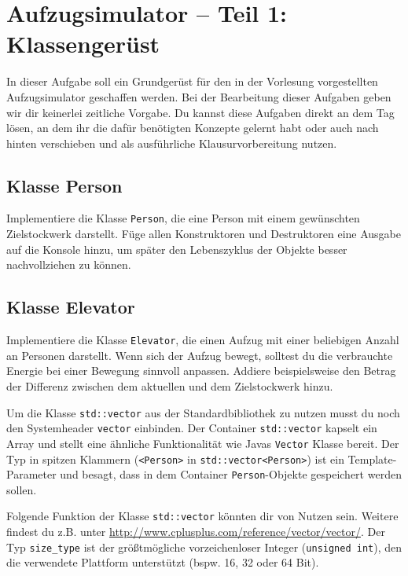 \section{\ExercisePrefixElevator Aufzugsimulator -- Teil 1: Klassengerüst \optional}

\optionaltextbox

%
In dieser Aufgabe soll ein Grundgerüst für den in der Vorlesung vorgestellten Aufzugsimulator geschaffen werden.
Bei der Bearbeitung dieser Aufgaben geben wir dir keinerlei zeitliche Vorgabe.
Du kannst diese Aufgaben direkt an dem Tag lösen, an dem ihr die dafür benötigten Konzepte gelernt habt oder auch nach hinten verschieben und als ausführliche Klausurvorbereitung nutzen.

\subsection{Klasse Person}
Implementiere die Klasse \lstinline{Person}, die eine Person mit einem gewünschten Zielstockwerk darstellt.
Füge allen Konstruktoren und Destruktoren eine Ausgabe auf die Konsole hinzu, um später den Lebenszyklus der Objekte besser nachvollziehen zu können.


\subsection{Klasse Elevator}
Implementiere die Klasse \lstinline{Elevator}, die einen Aufzug mit einer beliebigen Anzahl an Personen darstellt.
%
Wenn sich der Aufzug bewegt, solltest du die verbrauchte Energie bei einer Bewegung sinnvoll anpassen.
Addiere beispielsweise den Betrag der Differenz zwischen dem aktuellen und dem Zielstockwerk hinzu.


Um die Klasse \lstinline{std::vector} aus der Standardbibliothek zu nutzen musst du noch den Systemheader \lstinline{vector} einbinden.
Der Container \lstinline{std::vector} kapselt ein Array und stellt eine ähnliche Funktionalität wie Javas \lstinline{Vector} Klasse bereit.
Der Typ in spitzen Klammern (\lstinline{<Person>} in \lstinline{std::vector<Person>}) ist ein Template-Parameter und besagt, dass in dem Container \lstinline{Person}-Objekte gespeichert werden sollen.

Folgende Funktion der Klasse \lstinline{std::vector} könnten dir von Nutzen sein. Weitere findest du z.B. unter \url{http://www.cplusplus.com/reference/vector/vector/}. Der Typ \lstinline{size_type} ist der größtmögliche vorzeichenloser Integer (\lstinline{unsigned int}), den die verwendete Plattform unterstützt (bspw. 16, 32 oder 64 Bit).

